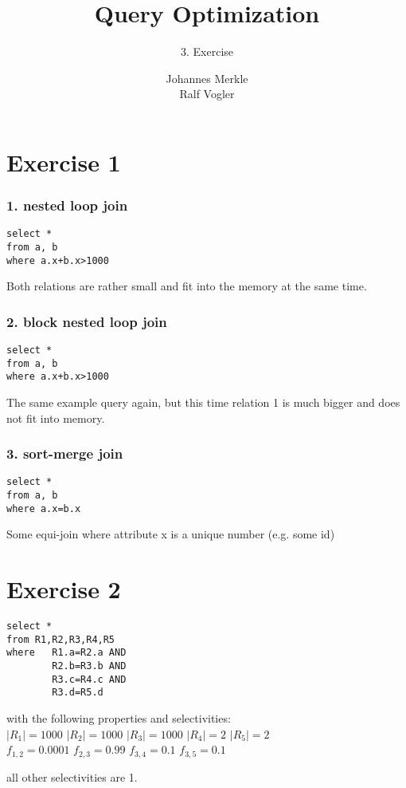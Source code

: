 \documentclass[11pt,a4paper]{scrartcl}
\begin{document}
\author{Johannes Merkle\\Ralf Vogler}
\title{Query Optimization}
\subtitle{3. Exercise}

\maketitle

\section*{Exercise 1}

\subsubsection*{1. nested loop join}

\begin{verbatim}
select *
from a, b
where a.x+b.x>1000
\end{verbatim}

Both relations are rather small and fit into the memory at the same time.

\subsubsection*{2. block nested loop join}

\begin{verbatim}
select *
from a, b
where a.x+b.x>1000
\end{verbatim}

The same example query again, but this time relation 1 is much bigger and does not fit into memory.

\subsubsection*{3. sort-merge join}


\begin{verbatim}
select *
from a, b
where a.x=b.x
\end{verbatim}

Some equi-join where attribute x is a unique number (e.g. some id)


\section*{Exercise 2}

\begin{verbatim}
select *
from R1,R2,R3,R4,R5
where 	R1.a=R2.a AND
		R2.b=R3.b AND
		R3.c=R4.c AND
		R3.d=R5.d
\end{verbatim}

with the following properties and selectivities:\\
$|R_1|=1000$
$|R_2|=1000$
$|R_3|=1000$
$|R_4|=2$
$|R_5|=2$\\
$f_{1,2}=0.0001$
$f_{2,3}=0.99$
$f_{3,4}=0.1$
$f_{3,5}=0.1$

all other selectivities are 1.
\end{document}
